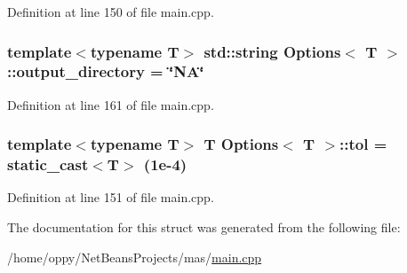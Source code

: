 Definition at line 150 of file main.\-cpp.

\hypertarget{struct_options_ac0336cacd551ef3176e4e133a179fb8b}{
\subsubsection[{output\-\_\-directory}]{\setlength{\rightskip}{0pt plus 5cm}template$<$typename T$>$ std\-::string {\bf Options}$<$ T $>$\-::output\-\_\-directory = \char`\"{}N\-A\char`\"{}}}\label{struct_options_ac0336cacd551ef3176e4e133a179fb8b}


Definition at line 161 of file main.\-cpp.

\hypertarget{struct_options_ac2dba4b15b871ca36825ec4c2fc38753}{
\subsubsection[{tol}]{\setlength{\rightskip}{0pt plus 5cm}template$<$typename T$>$ T {\bf Options}$<$ T $>$\-::tol = static\-\_\-cast$<$T$>$ (1e-\/4)}}\label{struct_options_ac2dba4b15b871ca36825ec4c2fc38753}


Definition at line 151 of file main.\-cpp.



The documentation for this struct was generated from the following file\-:\begin{DoxyCompactItemize}
\item 
/home/oppy/\-Net\-Beans\-Projects/mas/\hyperlink{main_8cpp}{main.\-cpp}\end{DoxyCompactItemize}

